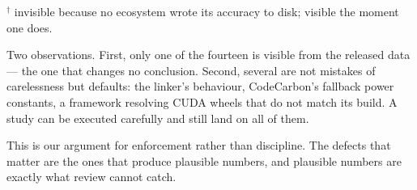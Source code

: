 \begin{table}[t]
\vspace{2pt}
\raggedright\footnotesize
\(^\dagger\) invisible because no ecosystem wrote its accuracy to disk; visible
the moment one does.
\end{table}

Two observations. First, only one of the fourteen is visible from the released
data --- the one that changes no conclusion. Second, several are not mistakes of
carelessness but defaults: the linker's  behaviour, CodeCarbon's
fallback power constants, a framework resolving CUDA wheels that do not match its
build. A study can be executed carefully and still land on all of them.

This is our argument for enforcement rather than discipline. The defects that
matter are the ones that produce plausible numbers, and plausible numbers are
exactly what review cannot catch.
